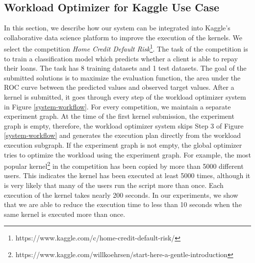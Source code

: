 {\subsection{Workload Optimizer for Kaggle Use Case}
In this section, we describe how our system can be integrated into Kaggle's collaborative data science platform to improve the execution of the kernels.
We select the competition \textit{Home Credit Default Risk}\footnote{https://www.kaggle.com/c/home-credit-default-risk/}.
The task of the competition is to train a classification model which predicts whether a client is able to repay their loans.
The task has 8 training datasets and 1 test datasets.
The goal of the submitted solutions is to maximize the evaluation function, the area under the ROC curve between the predicted values and observed target values.
After a kernel is submitted, it goes through every step of the workload optimizer system in Figure \ref{system-workflow}.
For every competition, we maintain a separate experiment graph.
At the time of the first kernel submission, the experiment graph is empty, therefore, the workload optimizer system skips Step 3 of Figure \ref{system-workflow} and generates the execution plan directly from the workload execution subgraph.
If the experiment graph is not empty, the global optimizer tries to optimize the workload using the experiment graph.
For example, the most popular kernel\footnote{https://www.kaggle.com/willkoehrsen/start-here-a-gentle-introduction} in the competition has been copied by more than 5000 different users.
This indicates the kernel has been executed at least 5000 times, although it is very likely that many of the users run the script more than once.
Each execution of the kernel takes nearly 200 seconds.
In our experiments, we show that we are able to reduce the execution time to less than 10 seconds when the same kernel is executed more than once.
}
%
